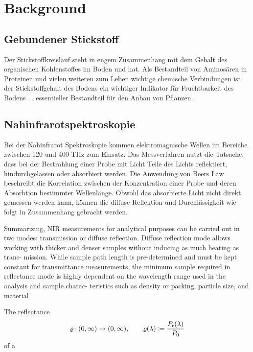 \section{Background}
\label{sec:background}
	
	\subsection{Gebundener Stickstoff}
	\label{ssec:Gebundener Stickstoff}
	
	Der Stickstoffkreislauf steht in engem Zusammenhang mit dem Gehalt des organischen Kohlenstoffes im Boden und hat. 
    Als Bestandteil von Aminosären in Proteinen und vielen weiteren zum Leben wichtige chemische Verbindungen ist der Stickstoffgehalt des Bodens ein wichtiger Indikator für Fruchtbarkeit des Bodens ... essentieller Bestandteil für den Anbau von Pflanzen.\\
		
	

	\subsection{Nahinfrarotspektroskopie}
	\label{ssec:nirs}
	
		Bei der Nahinfrarot Spektroskopie kommen elektromagnische Wellen im Bereiche zwischen 120 und 400 THz zum Einsatz. \cite{Agelet2010}
		Das Messverfahren nutzt die Tatsache, dass bei der Bestrahlung einer Probe mit Licht Teile des Lichts reflektiert, hindurchgelassen oder absorbiert werden.
		Die Anwendung von Beers Law beschreibt die Korrelation zwischen der Konzentration einer Probe und deren Absorbtion bestimmter Wellenlänge.
		Obwohl das absorbierte Licht nicht direkt gemessen werden kann, können die diffuse Reflektion und Durchlässigkeit wie folgt in Zusammenhang gebracht werden.
		
		
		Summarizing, NIR measurements for analytical purposes
can be carried out in two modes: transmission or diffuse
reflection. Diffuse reflection mode allows working with thicker
and denser samples without inducing as much heating as trans-
mission. While sample path length is pre-determined and must
be kept constant for transmittance measurements, the minimum
sample required in reflectance mode is highly dependent on
the wavelength range used in the analysis and sample charac-
teristics such as density or packing, particle size, and material
		
		 
		The reflectance 
		\[
			\varrho\colon(0,\infty)\to(0,\infty),\qquad \varrho(\lambda) \coloneqq \frac{P_{\mathrm{r}}(\lambda)}{P_0}
		\]
		of a 


